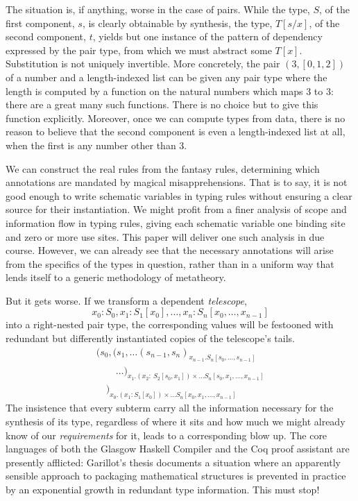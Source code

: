 \documentclass{jfp1}
\begin{document}
The situation is, if anything, worse in the case of pairs. While the
type, $S$, of the first component, $s$, is clearly obtainable by
synthesis, the type, $T[s/x]$, of the second component, $t$, yields
but one instance of the pattern of dependency expressed by the pair
type, from which we must abstract some $T[x]$. Substitution is not
uniquely invertible. More concretely, the pair $(3, [0,1,2])$ of a
number and a length-indexed list can be given any pair type where the
length is computed by a function on the natural numbers which maps $3$
to $3$: there are a great many such functions. There is no choice but
to give this function explicitly. Moreover, once we can compute types
from data, there is no reason to believe that the second component is
even a length-indexed list at all, when the first is any number other
than 3.

We can construct the real rules from the fantasy rules, determining
which annotations are mandated by magical misapprehensions. That is to
say, it is not good enough to write schematic variables in typing rules
without ensuring a clear source for their instantiation. We might profit
from a finer analysis of scope and information flow in typing rules, giving
each schematic variable one binding site and zero or more use sites.
This paper will deliver one such analysis in due course. However, we can
already see that the necessary annotations will arise from the specifics
of the types in question, rather than in a uniform way that lends itself
to a generic methodology of metatheory.

But it gets worse. If we transform a dependent \emph{telescope},
\[x_0\!:\!S_0,x_1\!:\!S_1[x_0],\ldots,x_n\!:\!S_n[x_0,\ldots,x_{n-1}]\]
into a right-nested pair type, the corresponding values will be
festooned with redundant but differently instantiated copies of the
telescope's tails.
\[\begin{array}{l}
    (s_0,(s_1,\ldots (s_{n-1},s_n)_{x_{n-1}.S_n[s_0,\ldots,s_{n-1}]}\\
    \qquad
    \ldots)_{x_1.(x_2\!:\:S_2[s_0,x_1])\times\ldots S_n[s_0,x_1,\ldots,x_{n-1}]}\\
    \quad)_{x_0.(x_1\!:\!S_1[x_0])\times\ldots S_n[x_0,x_1,\ldots,x_{n-1}]}
\end{array}\]
The insistence that every subterm carry all the information necessary
for the synthesis of its type, regardless of where it sits and how much
we might already know of our \emph{requirements} for it, leads to a
corresponding blow up. The core languages of both the Glasgow Haskell
Compiler and the Coq proof assistant are presently afflicted: Garillot's
thesis documents a situation where an apparently sensible approach to
packaging mathematical structures is prevented in practice by an
exponential growth in redundant type information. This must stop!
\end{document}
